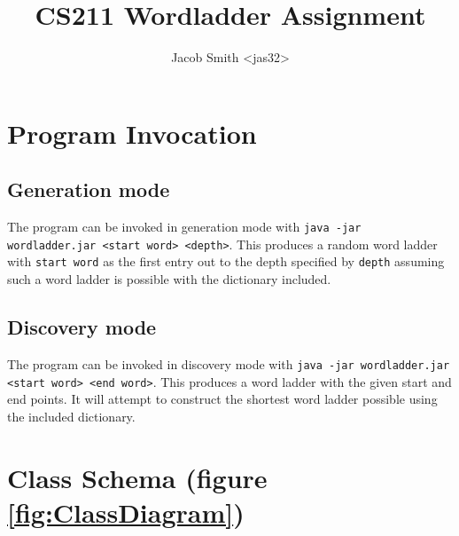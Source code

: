 \documentclass[11pt]{article} %
\title{CS211 Wordladder Assignment}
\author{Jacob Smith <jas32>}
\begin{document}
\maketitle

\section{Program Invocation}

\subsection{Generation mode}
The program can be invoked in generation mode with \texttt{java -jar wordladder.jar <start word> <depth>}. This produces a random word ladder with \texttt{start word} as the first entry out to the depth specified by \texttt{depth} assuming such a word ladder is possible with the dictionary included.

\subsection{Discovery mode}
The program can be invoked in discovery mode with \texttt{java -jar wordladder.jar <start word> <end word>}. This produces a word ladder with the given start and end points. It will attempt to construct the shortest word ladder possible using the included dictionary.

\section{Class Schema (figure \ref{fig:ClassDiagram}) }
\end{document}
